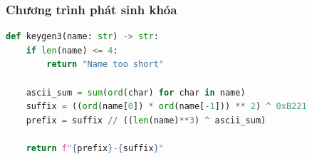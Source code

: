 \subsubsection{Chương trình phát sinh khóa}
\begin{lstlisting}[language=Python, caption={Chương trình phát sinh khóa}] 
def keygen3(name: str) -> str:
    if len(name) <= 4:
        return "Name too short"

    ascii_sum = sum(ord(char) for char in name)
    suffix = ((ord(name[0]) * ord(name[-1])) ** 2) ^ 0xB221
    prefix = suffix // ((len(name)**3) ^ ascii_sum)

    return f"{prefix}-{suffix}"
\end{lstlisting}